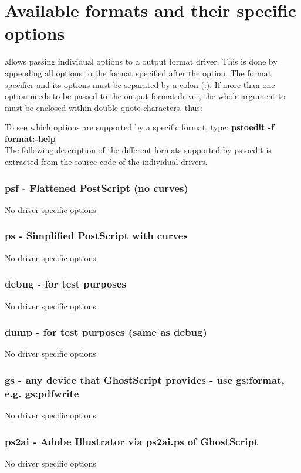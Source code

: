 \documentclass[english,a4paper]{article}
\begin{document}
\section{Available formats and their specific options}

 allows passing individual options to a output format driver. This is done by
appending all options to the format specified after the  option. The format
specifier and its options must be separated by a colon (:). If more than one
option needs to be passed to the output format driver, the whole argument to  must be
enclosed within double-quote characters, thus:


To see which options are supported by a specific format, type:
     \textbf{pstoedit -f format:-help}  
     \\ 

The following description of the different formats supported by pstoedit is extracted from the source code of the individual drivers.

\subsubsection{psf - Flattened PostScript (no curves)}
No driver specific options
\subsubsection{ps - Simplified PostScript with curves}
No driver specific options
\subsubsection{debug - for test purposes}
No driver specific options
\subsubsection{dump - for test purposes (same as debug)}
No driver specific options
\subsubsection{gs - any device that GhostScript provides - use gs:format, e.g. gs:pdfwrite}
No driver specific options
\subsubsection{ps2ai - Adobe Illustrator via ps2ai.ps of GhostScript}
No driver specific options
\end{document}
